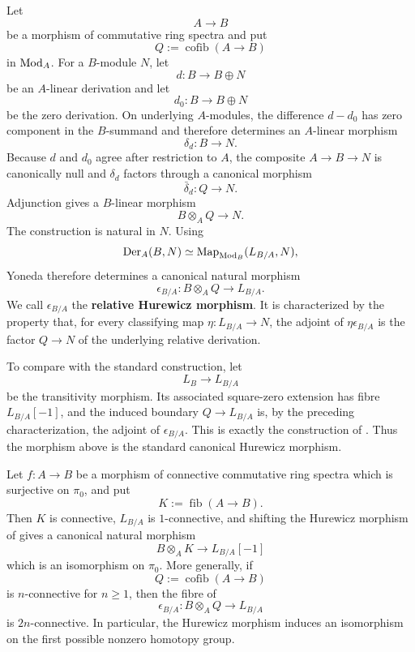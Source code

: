 \begin{construction}
\label{con:relative-hurewicz-morphism}
Let
\[
    A\longrightarrow B
\]
be a morphism of commutative ring spectra and put
\[
    Q:=\operatorname{cofib}(A\to B)
\]
in \(\operatorname{Mod}_A\). For a \(B\)-module \(N\), let
\[
    d:B\longrightarrow B\oplus N
\]
be an \(A\)-linear derivation and let
\[
    d_0:B\longrightarrow B\oplus N
\]
be the zero derivation. On underlying \(A\)-modules, the difference
\(d-d_0\) has zero component in the \(B\)-summand and therefore determines
an \(A\)-linear morphism
\[
    \delta_d:B\longrightarrow N.
\]
Because \(d\) and \(d_0\) agree after restriction to \(A\), the composite
\(A\to B\to N\) is canonically null and \(\delta_d\) factors through a
canonical morphism
\[
    \bar\delta_d:Q\longrightarrow N.
\]
Adjunction gives a \(B\)-linear morphism
\[
    B\otimes_AQ\longrightarrow N.
\]
The construction is natural in \(N\). Using
\[
    \operatorname{Der}_A(B,N)
    \simeq
    \operatorname{Map}_{\operatorname{Mod}_B}(L_{B/A},N),
\]
Yoneda therefore determines a canonical natural morphism
\[
    \epsilon_{B/A}:
    B\otimes_AQ
    \longrightarrow
    L_{B/A}.
\]
We call \(\epsilon_{B/A}\) the \textbf{relative Hurewicz morphism}. It is
characterized by the property that, for every classifying map
\(\eta:L_{B/A}\to N\), the adjoint of
\(\eta\epsilon_{B/A}\) is the factor
\(Q\to N\) of the underlying relative derivation.

To compare with the standard construction, let
\[
    L_B\longrightarrow L_{B/A}
\]
be the transitivity morphism. Its associated square-zero extension has
fibre \(L_{B/A}[-1]\), and the induced boundary
\(Q\to L_{B/A}\) is, by the preceding characterization, the adjoint of
\(\epsilon_{B/A}\). This is exactly the construction of
\cite[Construction~7.4.3.10]{LurieHigherAlgebra}. Thus the morphism above
is the standard canonical Hurewicz morphism.
\end{construction}

\begin{theorem}
\label{thm:relative-hurewicz-conormal}
Let \(f:A\to B\) be a morphism of connective commutative ring spectra which is
surjective on \(\pi_0\), and put
\[
    K:=\operatorname{fib}(A\to B).
\]
Then \(K\) is connective, \(L_{B/A}\) is \(1\)-connective, and shifting the
Hurewicz morphism of
 gives a canonical natural morphism
\[
    B\otimes_AK
    \longrightarrow
    L_{B/A}[-1]
\]
which is an isomorphism on \(\pi_0\).
More generally, if
\[
    Q:=\operatorname{cofib}(A\to B)
\]
is \(n\)-connective for \(n\geq1\), then the fibre of
\[
    \epsilon_{B/A}:B\otimes_AQ\longrightarrow L_{B/A}
\]
is \(2n\)-connective. In particular, the Hurewicz morphism induces an
isomorphism on the first possible nonzero homotopy group.
\end{theorem}

